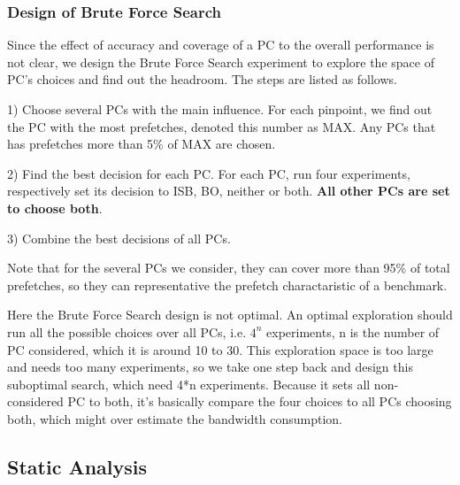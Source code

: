     \subsubsection{Design of Brute Force Search}
    \label{sec:designBFS}
    Since the effect of accuracy and coverage of a PC to the overall performance is not clear, we design the Brute Force Search experiment to explore the space of PC's choices and find out the headroom. The steps are listed as follows. \par
    1) Choose several PCs with the main influence. For each pinpoint, we find out the PC with the most prefetches, denoted this number as MAX. Any PCs that has prefetches more than 5\% of MAX are chosen.\par
    2) Find the best decision for each PC. For each PC, run four experiments, respectively set its decision to ISB, BO, neither or both. \textbf{All other PCs are set to choose both}.\par
    3) Combine the best decisions of all PCs.\par
    Note that for the several PCs we consider, they can cover more than 95\% of total prefetches, so they can representative the prefetch charactaristic of a benchmark. \par
    Here the Brute Force Search design is not optimal. An optimal exploration should run all the possible choices over all PCs, i.e. $4^{n}$ experiments, n is the number of PC considered, which it is around 10 to 30.
    This exploration space is too large and needs too many experiments, so we take one step back and design this suboptimal search, which need 4*n experiments. Because it sets all non-considered PC to both, it's basically compare the four choices to all PCs choosing both, which might over estimate the bandwidth consumption. \par

  \subsection{Static Analysis}
  \label{sec:staticanalysis}

  
